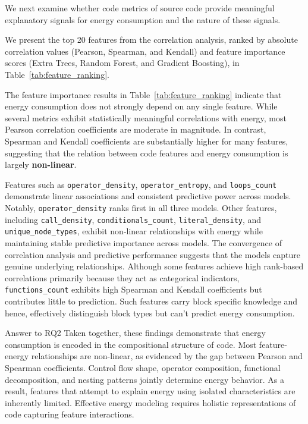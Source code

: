 

We next examine whether code metrics of source code provide meaningful explanatory signals for energy consumption and the nature of these signals.

\noindent
We present the top 20 features from the correlation analysis, ranked by absolute correlation values (Pearson, Spearman, and Kendall) and feature importance scores (Extra Trees, Random Forest, and Gradient Boosting), in Table~\ref{tab:feature_ranking}.

The feature importance results in Table~\ref{tab:feature_ranking} indicate that energy consumption does not strongly depend on any single feature. While several metrics exhibit statistically meaningful correlations with energy, most Pearson correlation coefficients are moderate in magnitude. In contrast, Spearman and Kendall coefficients are substantially higher for many features, suggesting that the relation between code features and energy consumption is largely \textbf{non-linear}.

Features such as \texttt{operator\_density}, \texttt{operator\_entropy}, and \texttt{loops\_count} demonstrate linear associations and consistent predictive power across models. Notably, \texttt{operator\_density} ranks first in all three models. Other features, including \texttt{call\_density}, \texttt{conditionals\_count}, \texttt{literal\_density}, and \texttt{unique\_node\_types}, exhibit non-linear relationships with energy while maintaining stable predictive importance across models. The convergence of correlation analysis and predictive performance suggests that the models capture genuine underlying relationships.
Although some features achieve high rank-based correlations primarily because they act as categorical indicators, \texttt{functions\_count} exhibits high Spearman and Kendall coefficients but contributes little to prediction. Such features carry block specific knowledge and hence, effectively distinguish block types but can't predict energy consumption.
\begin{rqbox}{Answer to RQ2}
Taken together, these findings demonstrate that energy consumption is encoded in the compositional structure of code. Most feature-energy relationships are non-linear, as evidenced by the gap between Pearson and Spearman coefficients. Control flow shape, operator composition, functional decomposition, and nesting patterns jointly determine energy behavior. As a result, features that attempt to explain energy using isolated characteristics are inherently limited. Effective energy modeling requires holistic representations of code capturing feature 
interactions.
\end{rqbox}


